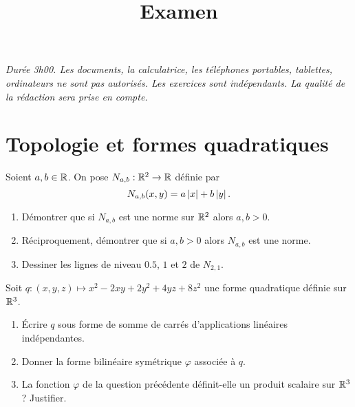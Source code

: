\documentclass[a4paper]{tp_um}
\title{\large \sffamily\bfseries Examen}
\begin{document}
\maketitle
\textit{Durée 3h00. Les documents, la calculatrice, les téléphones portables, tablettes, ordinateurs ne sont pas autorisés. Les exercices sont indépendants. La qualité de la rédaction sera prise en compte.} 

\bigskip
\bigskip


\section{Topologie et formes quadratiques}

\exo{} Soient $a, b \in \mathbb{R}$. On pose $N_{a,b}: \mathbb{R}^2 \to \mathbb{R}$ définie par \[N_{a,b}(x,y) = a \left\lvert x\right\rvert + b\left\lvert y\right\rvert.\]
\begin{enumerate}
    \item Démontrer que si $N_{a,b}$ est une norme sur $\mathbb{R}^2$ alors $a,b >0$. 
    \item Réciproquement, démontrer que si $a,b >0$ alors $N_{a,b}$ est une norme.
    \item Dessiner les lignes de niveau $0.5$, $1$ et $2$ de $N_{2,1}$.
\end{enumerate}

\exo{} Soit $q:(x,y,z) \mapsto x^2 -2xy + 2y^2 + 4yz + 8 z^2$ une forme quadratique définie sur $\mathbb{R}^3$.
\begin{enumerate}
    \item Écrire $q$ sous forme de somme de carrés d'applications linéaires indépendantes.
    \item Donner la forme bilinéaire symétrique $\varphi$ associée à $q$.

    \item La fonction $\varphi$ de la question précédente définit-elle un produit scalaire sur $\mathbb{R}^3$? Justifier.
\end{enumerate}
\end{document}
